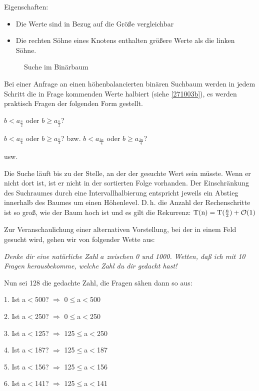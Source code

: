 \documentclass[ngerman,draft,parskip=half*,twoside]{scrreprt}
\theoremstyle{break}
\theoremstyle{nonumberbreak}
\newcommand*{\OO}{\mathcal{O}}      %
\begin{document}
Eigenschaften:
\begin{itemize}
	\item Die Werte sind in Bezug auf die Größe vergleichbar
	\item Die rechten Söhne eines Knotens enthalten größere Werte als die linken Söhne.
\end{itemize}

\begin{figure}
	\centering
	\caption{Suche im Binärbaum}
	\label{271003b}
\end{figure}

Bei einer Anfrage an einen höhenbalancierten binären Suchbaum werden in jedem Schritt die in Frage kommenden Werte halbiert (siehe \autoref{271003b}), es
werden praktisch Fragen der folgenden Form gestellt.

 \quad $ b < a_{\frac{n}{2}} $ oder $ b \geq a_{\frac{n}{2}} $?
 
 \quad $ b < a_{\frac{n}{4}} $ oder $ b \geq a_{\frac{n}{4}} $? bzw. $ b < a_{\frac{3n}{4}} $ oder $ b \geq a_{\frac{3n}{4}} $?

 \quad usw. 
 
Die Suche läuft bis zu der Stelle, an der der gesuchte Wert sein müsste. Wenn er nicht dort ist, ist er nicht in der sortierten Folge
vorhanden.
%
Der Einschränkung des Suchraumes durch eine Intervallhalbierung entspricht jeweils ein Abstieg innerhalb des Baumes um einen
Höhenlevel.
D.\,h. die Anzahl der Rechenschritte ist so groß, wie der Baum hoch ist und es gilt die Rekurrenz: 
$\textup{T}(\textup{n})=\textup{T}(\frac{\textup{n}}{2}) + \OO(1)$

Zur Veranschaulichung einer alternativen Vorstellung, bei der in einem Feld gesucht wird, gehen wir von folgender Wette aus:

\textit{Denke dir eine natürliche Zahl $a$ zwischen 0 und 1000. Wetten, daß ich mit 10 Fragen herausbekomme, welche Zahl du dir gedacht
hast!}

Nun sei 128 die gedachte Zahl, die Fragen sähen dann so aus:

1. Ist a$<$500? $\Rightarrow$ 0$\leq$a$<$500

2. Ist a$<$250? $\Rightarrow$ 0$\leq$a$<$250

3. Ist a$<$125? $\Rightarrow$ 125$\leq$a$<$250

4. Ist a$<$187? $\Rightarrow$ 125$\leq$a$<$187

5. Ist a$<$156? $\Rightarrow$ 125$\leq$a$<$156

6. Ist a$<$141? $\Rightarrow$ 125$\leq$a$<$141
\end{document}
